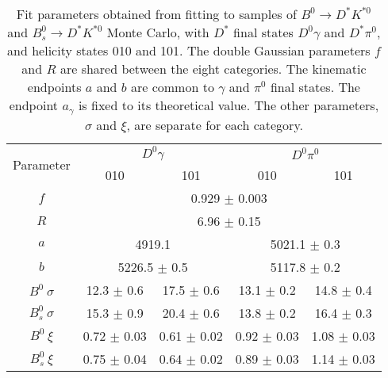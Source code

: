 \begin{table}
    \centering
    \begin{tabular}{ccccc}
        \toprule
        \multirow{2}{*}{Parameter} & \multicolumn{2}{c}{$D^0 \gamma$} & \multicolumn{2}{c}{$D^0 \pi^0$} \\
                                   & 010 & 101 & 010 & 101 \\
        \midrule
      $f$ & \multicolumn{4}{c}{0.929 $\pm$ 0.003} \\
      $R$ & \multicolumn{4}{c}{6.96 $\pm$ 0.15} \\
      \midrule
      $a$ & \multicolumn{2}{c}{4919.1} & \multicolumn{2}{c}{5021.1 $\pm$ 0.3} \\
      $b$ & \multicolumn{2}{c}{5226.5 $\pm$ 0.5} & \multicolumn{2}{c}{5117.8 $\pm$ 0.2} \\
      \midrule
      $B^0\ \sigma$ & 12.3 $\pm$ 0.6 & 17.5 $\pm$ 0.6 & 13.1 $\pm$ 0.2 & 14.8 $\pm$ 0.4 \\
      $B^0_s\ \sigma$ & 15.3 $\pm$ 0.9 & 20.4 $\pm$ 0.6 & 13.8 $\pm$ 0.2 & 16.4 $\pm$ 0.3 \\
      $B^0\ \xi$ & 0.72 $\pm$ 0.03 & 0.61 $\pm$ 0.02 & 0.92 $\pm$ 0.03 & 1.08 $\pm$ 0.03 \\
      $B^0_s\ \xi$ & 0.75 $\pm$ 0.04 & 0.64 $\pm$ 0.02 & 0.89 $\pm$ 0.03 & 1.14 $\pm$ 0.03 \\
        \bottomrule
    \end{tabular}
    \caption{Fit parameters obtained from fitting to samples of $B^0\to
D^*K^{*0}$ and $B^0_s \to D^*K^{*0}$ Monte Carlo, with $D^*$ final states $D^0\gamma$
and $D^*\pi^0$, and helicity states 010 and 101. The double Gaussian parameters $f$
and $R$ are shared between the eight categories. The kinematic endpoints $a$ and $b$
are common to $\gamma$ and $\pi^0$ final states. The endpoint $a_{\gamma}$ is fixed
to its theoretical value. The other parameters, $\sigma$ and $\xi$, are separate for each category.}
\label{tab:lowMass_mc_params}
\end{table}
